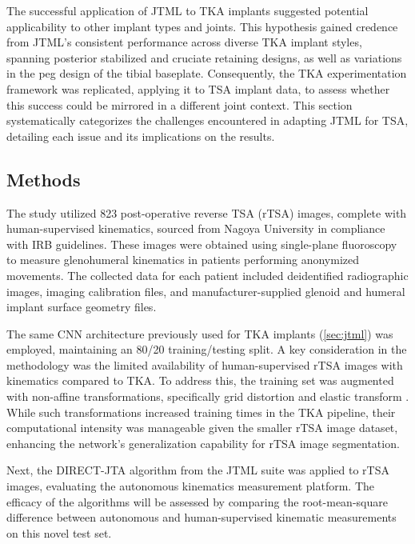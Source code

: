 The successful application of JTML to TKA implants suggested potential applicability to other implant types and joints.
This hypothesis gained credence from JTML's consistent performance across diverse TKA implant styles, spanning posterior stabilized and cruciate retaining designs, as well as variations in the peg design of the tibial baseplate.
Consequently, the TKA experimentation framework was replicated, applying it to TSA implant data, to assess whether this success could be mirrored in a different joint context.
This section systematically categorizes the challenges encountered in adapting JTML for TSA, detailing each issue and its implications on the results.

\subsection{Methods}
The study utilized 823 post-operative reverse TSA (rTSA) images, complete with human-supervised kinematics, sourced from Nagoya University in compliance with IRB guidelines.
These images were obtained using single-plane fluoroscopy to measure glenohumeral kinematics in patients performing anonymized movements.
The collected data for each patient included deidentified radiographic images, imaging calibration files, and manufacturer-supplied glenoid and humeral implant surface geometry files.


The same CNN architecture previously used for TKA implants \cite{wangDeepHighResolutionRepresentation2020} (\cref{sec:jtml}) was employed, maintaining an 80/20 training/testing split.
A key consideration in the methodology was the limited availability of human-supervised rTSA images with kinematics compared to TKA.
To address this, the training set was augmented with non-affine transformations, specifically grid distortion and elastic transform \cite{buslaevAlbumentationsFastFlexible2020}.
While such transformations increased training times in the TKA pipeline, their computational intensity was manageable given the smaller rTSA image dataset, enhancing the network's generalization capability for rTSA image segmentation.

Next, the DIRECT-JTA algorithm from the JTML suite was applied to rTSA images, evaluating the autonomous kinematics measurement platform.
The efficacy of the algorithms will be assessed by comparing the root-mean-square difference between autonomous and human-supervised kinematic measurements on this novel test set.

